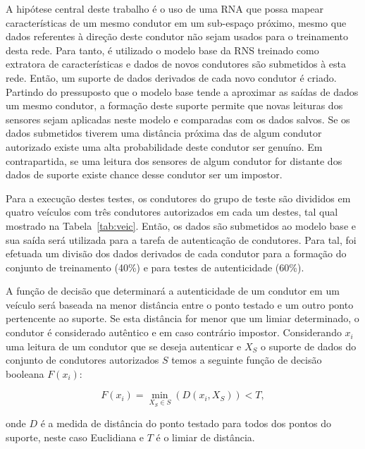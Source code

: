 \documentclass[conference,harvard,brazil,english]{sbatex}
\begin{document}
A hipótese central deste trabalho é o uso de uma RNA que possa mapear características de um mesmo condutor em um sub-espaço próximo, mesmo que dados referentes à direção deste condutor não sejam usados para o treinamento desta rede. Para tanto, é utilizado o modelo base da RNS treinado como extratora de características e dados de novos condutores são submetidos à esta rede. Então, um suporte de dados derivados de cada novo condutor é criado. Partindo do pressuposto que o modelo base tende a aproximar as saídas de dados um mesmo condutor, a formação deste suporte permite que novas leituras dos sensores sejam aplicadas neste modelo e comparadas com os dados salvos. Se os dados submetidos tiverem uma distância próxima das de algum condutor autorizado existe uma alta probabilidade deste condutor ser genuíno. Em contrapartida, se uma leitura dos sensores de algum condutor for distante dos dados de suporte existe chance desse condutor ser um impostor.

Para a execução destes testes, os condutores do grupo de teste são divididos em quatro veículos com três condutores autorizados em cada um destes, tal qual mostrado na Tabela~\ref{tab:veic}. Então, os dados são submetidos ao modelo base e sua saída será utilizada para a tarefa de autenticação de condutores. Para tal, foi efetuada um divisão dos dados derivados de cada condutor para a formação do conjunto de treinamento (40\%) e para testes de autenticidade (60\%). 

A função de decisão que determinará a autenticidade de um condutor em um veículo será baseada na menor distância entre o ponto testado e um outro ponto pertencente ao suporte. Se esta distância for menor que um limiar determinado, o condutor é considerado autêntico e em caso contrário impostor. Considerando $x_i$ uma leitura de um condutor que se deseja autenticar e $X_S$ o suporte de dados do conjunto de condutores autorizados $S$ temos a seguinte função de decisão booleana $F(x_i)$:

\begin{equation}
    F(x_i) = \min_{X_S \in S}(D(x_i,X_S)) < T,
\end{equation}

\noindent onde $D$ é a medida de distância do ponto testado para todos dos pontos do suporte, neste caso Euclidiana e $T$ é o limiar de distância. 
\end{document}
